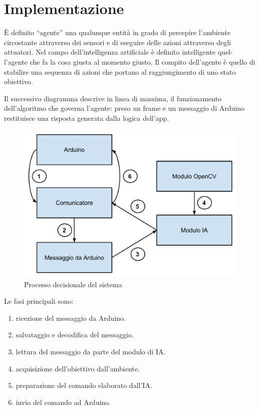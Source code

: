 \chapter{Implementazione}
\fancyfoot[C]{\thepage }
È definito ``agente'' una qualunque entità in grado di percepire l'ambiente
circostante attraverso dei sensori e di eseguire delle azioni attraverso degli
attuatori. Nel campo dell'intelligenza artificiale è definito intelligente quel-
l'agente che fa la cosa giusta al momento giusto. Il compito dell'agente è
quello di stabilire una sequenza di azioni che portano al raggiungimento di
uno stato obiettivo.\cite{agente}

Il successivo diagramma descrive in linea di massima, il funzionamento dell'algoritmo che governa l'agente: preso un frame e un messaggio
di Arduino restituisce una risposta generata dalla logica dell'app.
\begin{figure}[H] \center
\includegraphics[width=\textwidth]{immagini/schema_processo_new.pdf}
\caption{Processo decisionale del sistema} 
\end{figure}
Le fasi principali sono:
\begin{enumerate}
\item ricezione del messaggio da Arduino.
\item salvataggio e decodifica del messaggio.
\item lettura del messaggio da parte del modulo di IA.
\item acquisizione dell'obiettivo dall'ambiente.
\item preparazione del comando elaborato dall'IA.
\item invio del comando ad Arduino.
\end{enumerate}

